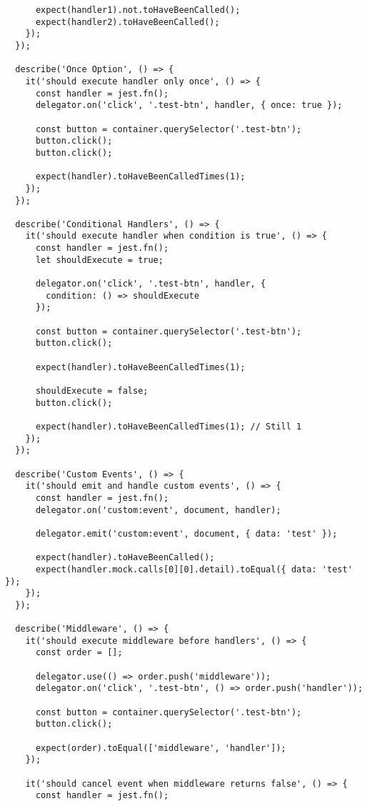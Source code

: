 \documentclass[11pt]{article}
\begin{document}
\begin{verbatim}
      expect(handler1).not.toHaveBeenCalled();
      expect(handler2).toHaveBeenCalled();
    });
  });
  
  describe('Once Option', () => {
    it('should execute handler only once', () => {
      const handler = jest.fn();
      delegator.on('click', '.test-btn', handler, { once: true });
      
      const button = container.querySelector('.test-btn');
      button.click();
      button.click();
      
      expect(handler).toHaveBeenCalledTimes(1);
    });
  });
  
  describe('Conditional Handlers', () => {
    it('should execute handler when condition is true', () => {
      const handler = jest.fn();
      let shouldExecute = true;
      
      delegator.on('click', '.test-btn', handler, {
        condition: () => shouldExecute
      });
      
      const button = container.querySelector('.test-btn');
      button.click();
      
      expect(handler).toHaveBeenCalledTimes(1);
      
      shouldExecute = false;
      button.click();
      
      expect(handler).toHaveBeenCalledTimes(1); // Still 1
    });
  });
  
  describe('Custom Events', () => {
    it('should emit and handle custom events', () => {
      const handler = jest.fn();
      delegator.on('custom:event', document, handler);
      
      delegator.emit('custom:event', document, { data: 'test' });
      
      expect(handler).toHaveBeenCalled();
      expect(handler.mock.calls[0][0].detail).toEqual({ data: 'test' });
    });
  });
  
  describe('Middleware', () => {
    it('should execute middleware before handlers', () => {
      const order = [];
      
      delegator.use(() => order.push('middleware'));
      delegator.on('click', '.test-btn', () => order.push('handler'));
      
      const button = container.querySelector('.test-btn');
      button.click();
      
      expect(order).toEqual(['middleware', 'handler']);
    });
    
    it('should cancel event when middleware returns false', () => {
      const handler = jest.fn();
      

\end{verbatim}
\end{document}
